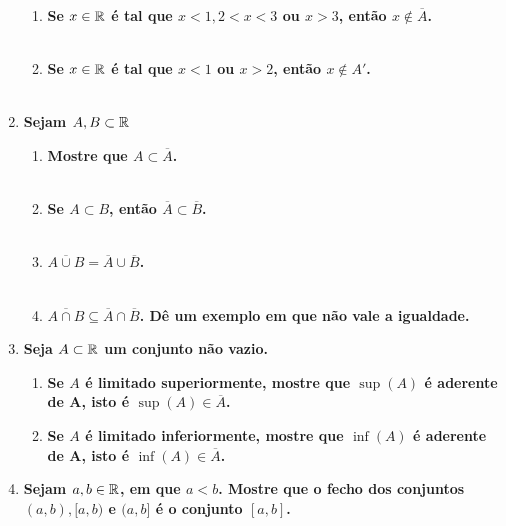 \documentclass[%
  a4paper,%
  12pt,%
  fleqn,%
  english,%
  brazilian,%
]{article}
\begin{document}
\begin{enumerate}[wide, labelwidth=!, labelindent=0pt]
	\begin{enumerate}[label=\alph*)]
		\item \textbf{Se $x \in \mathbb R$ é tal que $x<1, 2<x<3$ ou $x>3$, então $x \not \in \overline{A}$.}\\
		\\
		\newpage
		\item \textbf{Se $x \in \mathbb R$ é tal que $x<1$ ou $x>2$, então $x \not \in A'$.}\\
		\\
	\end{enumerate}
	\item \textbf{Sejam $A, B \subset \mathbb R$}
	\begin{enumerate}[label=\alph*)]
		\item \textbf{Mostre que $A \subset \overline{A}$.\\}
		\\
		\item \textbf{Se $A \subset B$, então $\overline{A} \subset \overline{B}$.}\\
		\\
		\item \textbf{$\overline{A \cup B} = \overline{A} \cup \overline{B}$.}\\
		\\
		\item \textbf{$\overline{A \cap B}\subseteq\overline{A}\cap\overline{B}$. Dê um exemplo em que não vale a igualdade.}\\
	\end{enumerate}
	\item \textbf{Seja $A \subset \mathbb R$ um conjunto não vazio.}
	\begin{enumerate}
		\item \textbf{Se $A$ é limitado superiormente, mostre que $\sup(A)$ é aderente de A, isto é $\sup(A) \in \overline A$.}\\
		\item \textbf{Se $A$ é limitado inferiormente, mostre que $\inf(A)$ é aderente de A, isto é $\inf(A) \in \overline A$.}\\
	\end{enumerate}
	\item \textbf{Sejam $a, b \in \mathbb R$, em que $a<b$. Mostre que o fecho dos conjuntos $(a, b), [a, b)$ e $(a, b]$ é o conjunto $[a, b]$.}\\

\end{enumerate}
\end{document}
